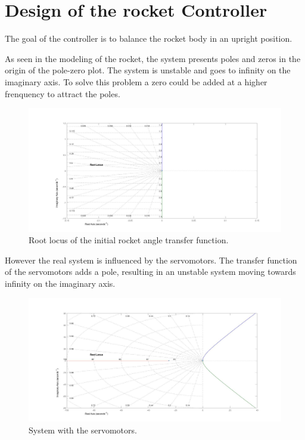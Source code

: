 \graphicspath{{figures/Design/IPController/}}

\chapter{Design of the rocket Controller}\label{sec:IPController}
The goal of the controller is to balance the rocket body in an upright position. 

As seen in the modeling of the rocket, the system presents poles and zeros in the origin of the pole-zero plot. The system is unstable and goes to infinity on the imaginary axis. To solve this problem a zero could be added at a higher frenquency to attract the poles.

\begin{figure}[htbp]
	\centering
	
		\includegraphics[width=\textwidth]{figures/Rocket/design/initial_transfer_function}
		\caption{Root locus of the initial rocket angle transfer function.}
		\label{fig:Rinitialtf}
	
\end{figure}

However the real system is influenced by the servomotors. The transfer function of the servomotors adds a pole, resulting in an unstable system moving towards infinity on the imaginary axis. 
				
\begin{figure}[htbp]
	\centering
		\includegraphics[width=\textwidth]{figures/Rocket/design/tf_with_servo}
		\caption{System with the servomotors.}
		\label{fig:SystemServo}
\end{figure}

